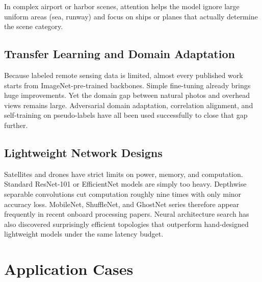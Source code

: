 \documentclass[12pt,a4paper]{article}
\begin{document}
In complex airport or harbor scenes, attention helps the model ignore large uniform areas (sea, runway) and focus on ships or planes that actually determine the scene category.

\subsection{Transfer Learning and Domain Adaptation}

Because labeled remote sensing data is limited, almost every published work starts from ImageNet-pre-trained backbones. Simple fine-tuning already brings huge improvements. Yet the domain gap between natural photos and overhead views remains large. Adversarial domain adaptation, correlation alignment, and self-training on pseudo-labels have all been used successfully to close that gap further.

\subsection{Lightweight Network Designs}

Satellites and drones have strict limits on power, memory, and computation. Standard ResNet-101 or EfficientNet models are simply too heavy. Depthwise separable convolutions cut computation roughly nine times with only minor accuracy loss. MobileNet, ShuffleNet, and GhostNet series therefore appear frequently in recent onboard processing papers. Neural architecture search has also discovered surprisingly efficient topologies that outperform hand-designed lightweight models under the same latency budget.

\section{Application Cases}
\label{sec:applications}

\begin{table}[h!]
\centering
\caption{Comparison of Major Deep Learning Tasks in Remote Sensing}
\label{tab:task_comparison}
\end{table}
\end{document}
